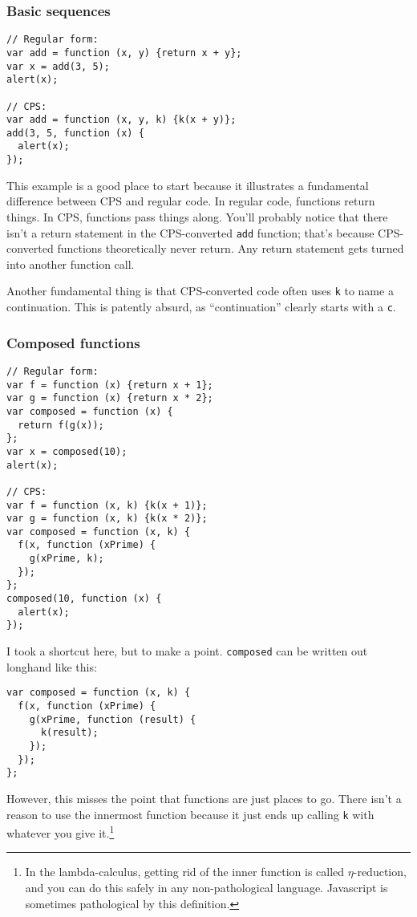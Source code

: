 \documentclass{article}
\begin{document}
\subsubsection{Basic sequences}\label{sec:cps-conversion-basic-sequences}
\begin{verbatim}
// Regular form:
var add = function (x, y) {return x + y};
var x = add(3, 5);
alert(x);

// CPS:
var add = function (x, y, k) {k(x + y)};
add(3, 5, function (x) {
  alert(x);
});
\end{verbatim}

      This example is a good place to start because it illustrates a fundamental difference between CPS and regular code. In regular code, functions return things. In CPS, functions pass
      things along. You'll probably notice that there isn't a return statement in the CPS-converted {\tt add} function; that's because CPS-converted functions theoretically never return. Any
      return statement gets turned into another function call.

      Another fundamental thing is that CPS-converted code often uses {\tt k} to name a continuation. This is patently absurd, as ``continuation'' clearly starts with a {\tt c}.

\subsubsection{Composed functions}\label{sec:cps-conversion-composed-functions}
\begin{verbatim}
// Regular form:
var f = function (x) {return x + 1};
var g = function (x) {return x * 2};
var composed = function (x) {
  return f(g(x));
};
var x = composed(10);
alert(x);

// CPS:
var f = function (x, k) {k(x + 1)};
var g = function (x, k) {k(x * 2)};
var composed = function (x, k) {
  f(x, function (xPrime) {
    g(xPrime, k);
  });
};
composed(10, function (x) {
  alert(x);
});
\end{verbatim}

      I took a shortcut here, but to make a point. {\tt composed} can be written out longhand like this:

\begin{verbatim}
var composed = function (x, k) {
  f(x, function (xPrime) {
    g(xPrime, function (result) {
      k(result);
    });
  });
};
\end{verbatim}

      \noindent However, this misses the point that functions are just places to go. There isn't a reason to use the innermost function because it just ends up calling {\tt k} with whatever
      you give it.\footnote{In the lambda-calculus, getting rid of the inner function is called $\eta$-reduction, and you can do this safely in any non-pathological language. Javascript is
      sometimes pathological by this definition.}
\end{document}
